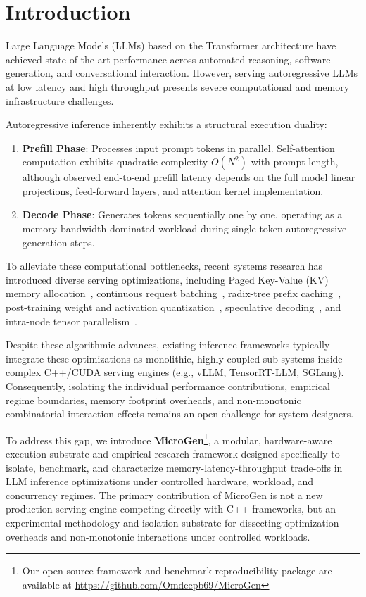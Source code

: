 \section{Introduction}
\label{sec:introduction}

Large Language Models (LLMs) based on the Transformer architecture have achieved state-of-the-art performance across automated reasoning, software generation, and conversational interaction. However, serving autoregressive LLMs at low latency and high throughput presents severe computational and memory infrastructure challenges. 

Autoregressive inference inherently exhibits a structural execution duality:
\begin{enumerate}
    \item \textbf{Prefill Phase}: Processes input prompt tokens in parallel. Self-attention computation exhibits quadratic complexity $O(N^2)$ with prompt length, although observed end-to-end prefill latency depends on the full model linear projections, feed-forward layers, and attention kernel implementation.
    \item \textbf{Decode Phase}: Generates tokens sequentially one by one, operating as a memory-bandwidth-dominated workload during single-token autoregressive generation steps.
\end{enumerate}

To alleviate these computational bottlenecks, recent systems research has introduced diverse serving optimizations, including Paged Key-Value (KV) memory allocation~\cite{kwon2023pagedattention}, continuous request batching~\cite{yu2022orca}, radix-tree prefix caching~\cite{zheng2024sglang}, post-training weight and activation quantization~\cite{dettmers2022llmint8,xiao2023smoothquant}, speculative decoding~\cite{chen2023speculative,leviathan2023fast}, and intra-node tensor parallelism~\cite{shoeybi2019megatron}.

Despite these algorithmic advances, existing inference frameworks typically integrate these optimizations as monolithic, highly coupled sub-systems inside complex C++/CUDA serving engines (e.g., vLLM, TensorRT-LLM, SGLang). Consequently, isolating the individual performance contributions, empirical regime boundaries, memory footprint overheads, and non-monotonic combinatorial interaction effects remains an open challenge for system designers.

To address this gap, we introduce \textbf{MicroGen}\footnote{Our open-source framework and benchmark reproducibility package are available at \url{https://github.com/Omdeepb69/MicroGen}}, a modular, hardware-aware execution substrate and empirical research framework designed specifically to isolate, benchmark, and characterize memory-latency-throughput trade-offs in LLM inference optimizations under controlled hardware, workload, and concurrency regimes. The primary contribution of \textsf{MicroGen} is not a new production serving engine competing directly with C++ frameworks, but an experimental methodology and isolation substrate for dissecting optimization overheads and non-monotonic interactions under controlled workloads.

